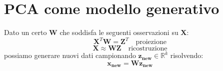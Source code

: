 \documentclass{article}
\begin{document}
        \section{PCA come modello generativo}
            Dato un certo $\mathbf{W}$ che soddisfa le seguenti osservazioni su $\mathbf{X}$:
            \[\mathbf{X}^T\mathbf{W} = \mathbf{Z}^T \quad \text{proiezione}\]
            \[\mathbf{X} \approx \mathbf{WZ} \quad \text{ricostruzione}\]
            possiamo generare nuovi dati campionando $\mathbf{z_{new}} \in \mathbb{R}^k$ risolvendo:
            \[\mathbf{x_{new}} = \mathbf{Wz_{new}}\]
        
\end{document}
